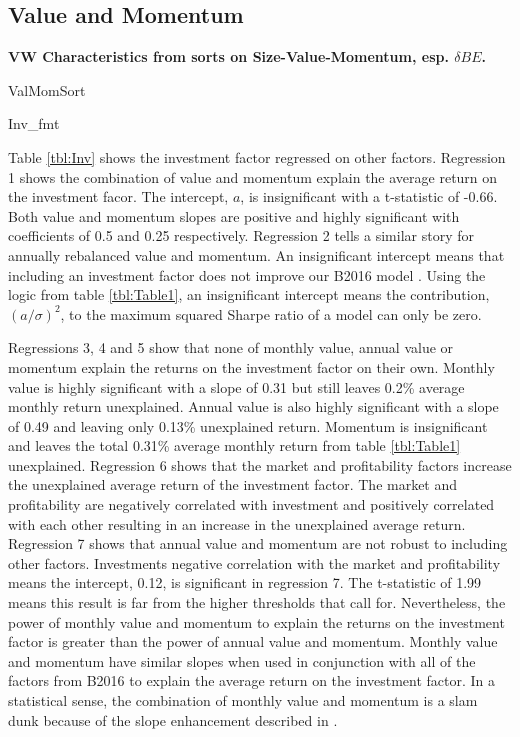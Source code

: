 
\subsection{Value and Momentum}

\textbf{VW Characteristics from sorts on Size-Value-Momentum, esp. $\delta BE$.}

{ValMomSort}

{Inv_fmt}

Table \ref{tbl:Inv} shows the investment factor regressed on other factors. Regression 1
shows the combination of value and momentum explain the average return on the investment
facor. The intercept, $a$, is insignificant with a t-statistic of -0.66. Both value and
momentum slopes are positive and highly significant with coefficients of 0.5 and 0.25
respectively. Regression 2 tells a similar story for annually rebalanced value and
momentum. An insignificant intercept means that including an investment factor does not
improve our B2016 model \parencite{fama1998determining, barillas2016alpha,
fama2016choosing}. Using the logic from table \ref{tbl:Table1}, an insignificant intercept
means the contribution, $(a/\sigma)^2$, to the maximum squared Sharpe ratio of a model can
only be zero.

Regressions 3, 4 and 5 show that none of monthly value, annual value or momentum explain
the returns on the investment factor on their own. Monthly value is highly significant
with a slope of 0.31 but still leaves 0.2\% average monthly return unexplained. Annual
value is also highly significant with a slope of 0.49 and leaving only 0.13\% unexplained
return. Momentum is insignificant and leaves the total 0.31\% average monthly return from
table \ref{tbl:Table1} unexplained. Regression 6 shows that the market and profitability
factors increase the unexplained average return of the investment factor. The market and
profitability are negatively correlated with investment and positively correlated with
each other resulting in an increase in the unexplained average return. Regression 7 shows
that annual value and momentum are not robust to including other factors. Investments
negative correlation with the market and profitability means the intercept, 0.12, is
significant in regression 7. The t-statistic of 1.99 means this result is far from the
higher thresholds that \textcite{harvey2016and} call for. Nevertheless, the power of
monthly value and momentum to explain the returns on the investment factor is greater than
the power of annual value and momentum. Monthly value and momentum have similar slopes
when used in conjunction with all of the factors from B2016 to explain the average return
on the investment factor. In a statistical sense, the combination of monthly value and
momentum is a slam dunk because of the slope enhancement described in
\textcite{fama2015incremental}.

